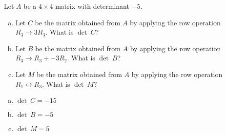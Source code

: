 
\begin{exerciseStatement}


Let \(A\) be a \(4 \times 4\) matrix with determinant \( -5 \).


\begin{enumerate}[(a)]
\item Let \(C\) be the matrix obtained from \(A\) by applying the row operation \( R_3 \to 3R_3 \). What is \(\operatorname{det}\ C\)?
\item Let \(B\) be the matrix obtained from \(A\) by applying the row operation \( R_3 \to R_3 + -3R_2 \). What is \(\operatorname{det}\ B\)?
\item Let \(M\) be the matrix obtained from \(A\) by applying the row operation \( R_1 \leftrightarrow R_3 \). What is \(\operatorname{det}\ M\)?
\end{enumerate}
    
\end{exerciseStatement}
    
\begin{exerciseAnswer} 

\begin{enumerate}[(a)]
\item \(\operatorname{det}\ C= -15 \)
\item \(\operatorname{det}\ B= -5 \)
\item \(\operatorname{det}\ M= 5 \)
\end{enumerate}
    
\end{exerciseAnswer}
    
